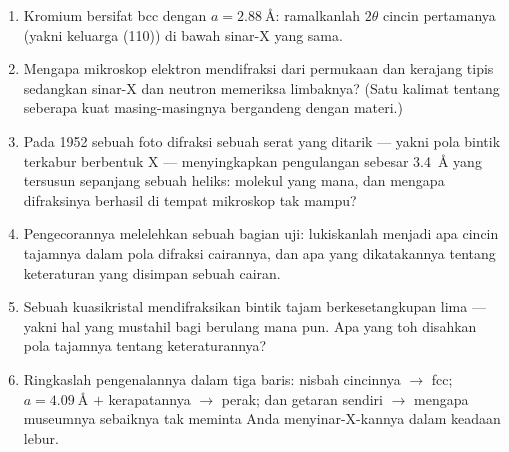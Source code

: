 \begin{problem}
\begin{enumerate}[resume]
  \item Kromium bersifat bcc dengan $a = \qty{2.88}{\angstrom}$: ramalkanlah
        $2\theta$ cincin pertamanya (yakni keluarga (110)) di bawah
        sinar-X yang sama.
  \item Mengapa mikroskop elektron mendifraksi dari permukaan dan
        kerajang tipis sedangkan sinar-X dan neutron memeriksa limbaknya? (Satu
        kalimat tentang seberapa kuat masing-masingnya bergandeng dengan materi.)
  \item Pada 1952 sebuah foto difraksi sebuah serat yang ditarik --- yakni
        pola bintik terkabur berbentuk X --- menyingkapkan pengulangan sebesar
        \qty{3.4}{\angstrom} yang tersusun sepanjang sebuah heliks: molekul yang
        mana, dan mengapa difraksinya berhasil di tempat mikroskop tak
        mampu?
  \item Pengecorannya melelehkan sebuah bagian uji: lukiskanlah menjadi apa
        cincin tajamnya dalam pola difraksi cairannya, dan apa
        yang dikatakannya tentang keteraturan yang disimpan sebuah cairan.
  \item Sebuah kuasikristal mendifraksikan bintik tajam berkesetangkupan
        lima --- yakni hal yang mustahil bagi  berulang mana pun. Apa
        yang toh disahkan pola tajamnya tentang keteraturannya?
  \item Ringkaslah pengenalannya dalam tiga baris: nisbah cincinnya
        $\to$ fcc; $a = \qty{4.09}{\angstrom}$ $+$ kerapatannya $\to$
        perak; dan getaran  sendiri $\to$ mengapa
        museumnya sebaiknya tak meminta Anda menyinar-X-kannya dalam keadaan lebur.
\end{enumerate}
\end{problem}
